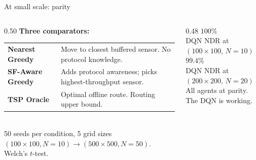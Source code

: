 \documentclass[aspectratio=169,11pt]{beamer}
\newcommand{\emp}[1]{{\color{manpurple}\textbf{#1}}}
\newcommand{\qt}[1]{{\color{muted}#1}}
\newcommand{\hero}[2]{%
  {\fontsize{44pt}{52pt}\selectfont\color{manpurple}\textbf{#1}}\\[2pt]%
  {\color{muted}\small #2}%
}
\begin{document}
\begin{frame}{At small scale: parity}
  \begin{columns}[c]
    \begin{column}{0.50\textwidth}
      \small
      \textbf{Three comparators:}\\[0.5em]
      \begin{tabular}{@{}p{2.8cm} p{4.4cm}@{}}
        \emp{Nearest Greedy}  & Move to closest buffered sensor. No protocol knowledge.\\[0.4em]
        \emp{SF-Aware Greedy} & Adds protocol awareness; picks highest-throughput sensor.\\[0.4em]
        \emp{TSP Oracle}      & Optimal offline route. Routing upper bound.\\
      \end{tabular}\\[0.8em]
      \footnotesize\qt{50 seeds per condition, 5 grid sizes
      $(100\!\times\!100, N{=}10) \to (500\!\times\!500, N{=}50)$.
      Welch's $t$-test.}
    \end{column}
    \begin{column}{0.48\textwidth}
      \centering
      \vspace{0.5em}
      \hero{$100\%$}{DQN NDR at $(100\!\times\!100,\, N{=}10)$}\\[1.2em]
      \hero{$99.4\%$}{DQN NDR at $(200\!\times\!200,\, N{=}20)$}\\[0.8em]
      \small\qt{All agents at parity. The DQN is working.}
    \end{column}
  \end{columns}
\end{frame}
\end{document}

